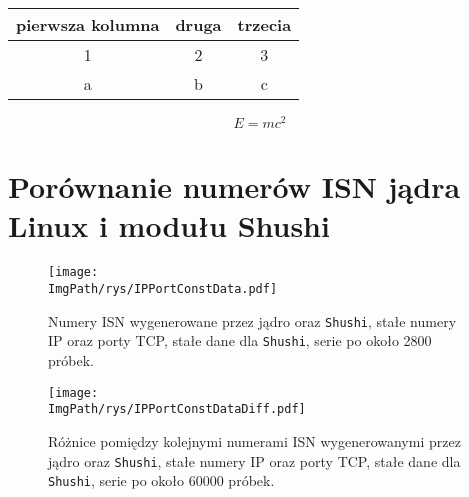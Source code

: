 \documentclass[a4paper,12pt,twoside,openany]{report}
\newcommand{\ImgPath}{.}
\newcommand{\tech}{\texttt}
\begin{document}
\begin{tabular}{c|cc}
pierwsza kolumna & druga & trzecia \\ \hline
1 & 2 & 3 \\
a & b & c \\
\end{tabular} 

\begin{equation}
 E = m c^2 \label{einstein}
\end{equation}



\appendix
\chapter{Porównanie numerów ISN jądra Linux i modułu Shushi}
\begin{figure}[!htbp]
	\begin{center}
\centering
\texttt{[image: \\ImgPath/rys/IPPortConstData.pdf]}
\end{center}
	\caption{Numery ISN wygenerowane przez jądro oraz \tech{Shushi}, stałe 
numery IP oraz porty TCP, stałe dane dla \tech{Shushi}, serie po około 2800 
próbek.}
	\label{IPPortConstData}
\end{figure}

\begin{figure}[!htbp]
	\begin{center}
\centering
\texttt{[image: \\ImgPath/rys/IPPortConstDataDiff.pdf]}
\end{center}
	\caption{Różnice pomiędzy kolejnymi numerami ISN wygenerowanymi przez 
jądro oraz \tech{Shushi}, stałe numery IP oraz porty TCP, stałe dane dla 
\tech{Shushi}, serie po około 60000 próbek.}
	\label{IPPortConstDataDiff}
\end{figure}
\end{document}
